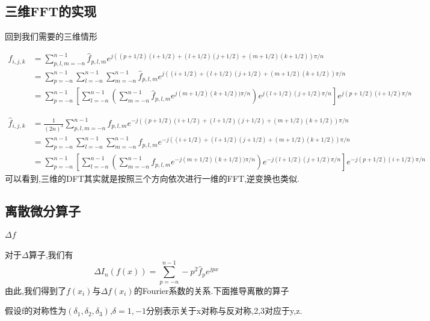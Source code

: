 \documentclass[UTF8]{ctexart}
\begin{document}
\subsection{三维FFT的实现}
回到我们需要的三维情形

\begin{equation}
 \begin{split}
f_{i,j,k} & = \sum\limits_{p,l,m=-n}^{n-1}\hat{f}_{p,l,m} e^{j((p+1/2)(i+1/2)+(l+1/2)(j+1/2)+(m+1/2)(k+1/2))\pi/n} \\
 &= \sum\limits_{p=-n}^{n-1} \sum\limits_{l=-n}^{n-1} \sum\limits_{m=-n}^{n-1}\hat{f}_{p,l,m} e^{j((i+1/2)+(l+1/2)(j+1/2)+(m+1/2)(k+1/2))\pi/n} \\
 &= \sum\limits_{p=-n}^{n-1} \left[\sum\limits_{l=-n}^{n-1} \left(\sum\limits_{m=-n}^{n-1}\hat{f}_{p,l,m} e^{j(m+1/2)(k+1/2))\pi/n}\right) e^{j(l+1/2)(j+1/2)\pi/n} \right] e^{j(p+1/2)(i+1/2)\pi/n}
 \end{split}
\end{equation}

\begin{equation}
 \begin{split}
\hat{f}_{i,j,k} & = \frac{1}{(2n)^3}\sum\limits_{p,l,m=-n}^{n-1}f_{p,l,m} e^{-j((p+1/2)(i+1/2)+(l+1/2)(j+1/2)+(m+1/2)(k+1/2))\pi/n} \\
 &= \sum\limits_{p=-n}^{n-1} \sum\limits_{l=-n}^{n-1} \sum\limits_{m=-n}^{n-1}f_{p,l,m} e^{-j((i+1/2)+(l+1/2)(j+1/2)+(m+1/2)(k+1/2))\pi/n} \\
 &= \sum\limits_{p=-n}^{n-1} \left[\sum\limits_{l=-n}^{n-1} \left(\sum\limits_{m=-n}^{n-1}f_{p,l,m} e^{-j(m+1/2)(k+1/2))\pi/n}\right) e^{-j(l+1/2)(j+1/2)\pi/n} \right] e^{-j(p+1/2)(i+1/2)\pi/n}
 \end{split}
\end{equation}
可以看到,三维的DFT其实就是按照三个方向依次进行一维的FFT,逆变换也类似.
\subsection{离散微分算子}
\paragraph{$\Delta f$}
对于$\Delta$算子,我们有
$$
\Delta I_n(f(x)) =  \sum\limits_{p=-n}^{n-1}-p^2\hat{f}_p e^{jpx}
$$
由此,我们得到了$f(x_i)$与$\Delta f(x_i)$的Fourier系数的关系.下面推导离散的算子

假设f的对称性为$(\delta_1,\delta_2,\delta_3)$,$\delta=1,-1$分别表示关于x对称与反对称,2,3对应于y,z.
\end{document}
